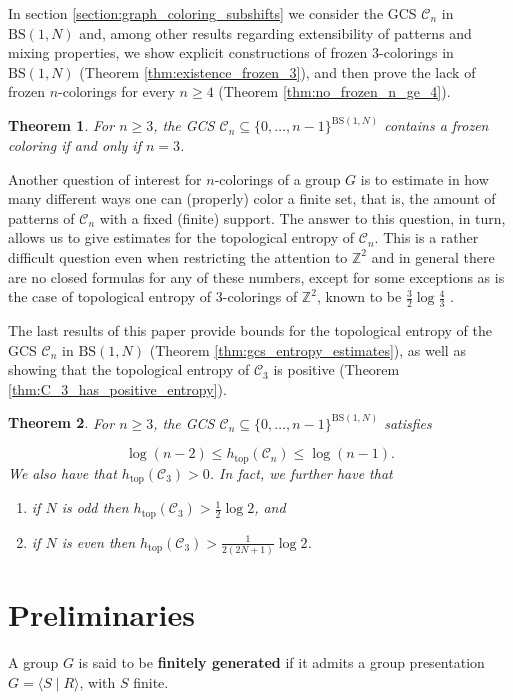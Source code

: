 \documentclass{aims}
\newcommand{\BS}[1][N]{\mathrm{BS}(1,#1)}
\def\htop{h_{\mathrm{top}}}
\newtheorem{theorem}{Theorem}[section]
\theoremstyle{definition}
\begin{document}
In section \ref{section:graph_coloring_subshifts} we consider the GCS $\mathcal{C}_n$ in $\BS$ and, among other results regarding extensibility of patterns and mixing properties, we show explicit constructions of frozen $3$-colorings in $\BS$ (Theorem \ref{thm:existence_frozen_3}), and then prove the lack of frozen $n$-colorings for every $n\ge 4$ (Theorem \ref{thm:no_frozen_n_ge_4}).

\begin{theorem}\label{thm:summary_gcs_frozen_colorings}
	For $n\ge 3$, the GCS $\mathcal{C}_n\subseteq\{0,\ldots,n-1\}^{\BS}$ contains a frozen coloring if and only if $n=3$.
\end{theorem}	

Another question of interest for $n$-colorings of a group $G$ is to estimate in how many different ways one can (properly) color a finite set, that is, the amount of patterns of $\mathcal{C}_n$ with a fixed (finite) support. The answer to this question, in turn, allows us to give estimates for the topological entropy of $\mathcal{C}_n$. This is a rather difficult question even when restricting the attention to $\mathbb{Z}^2$ and in general there are no closed formulas for any of these numbers, except for some exceptions as is the case of topological entropy of $3$-colorings of $\mathbb{Z}^2$, known to be $\frac{3}{2}\log\frac{4}{3}$ \cite{Lieb:1967zz}.


The last results of this paper provide bounds for the topological entropy of the GCS $\mathcal{C}_n$ in $\BS$ (Theorem \ref{thm:gcs_entropy_estimates}), as well as showing that the topological entropy of $\mathcal{C}_3$ is positive (Theorem \ref{thm:C_3_has_positive_entropy}).
\begin{theorem} \label{thm:summary_gcs_entropy}
	For $n\ge 3$, the GCS $\mathcal{C}_n\subseteq\{0,\ldots,n-1\}^{\BS}$ satisfies
	
	$$
	\log(n-2)\le\htop(\mathcal{C}_n)\le\log(n-1).
	$$
	We also have that $\htop(\mathcal{C}_3)>0$. In fact, we further have that
	\begin{enumerate}
		\item if $N$ is odd then $\htop(\mathcal{C}_3)>\frac{1}{2}\log 2$, and
		\item if $N$ is even then $\htop(\mathcal{C}_3)>\frac{1}{2(2N+1)}\log 2$.
	\end{enumerate}
\end{theorem}
	\section{Preliminaries}\label{section:preliminaries}
A group $G$ is said to be \textbf{finitely generated} if it admits a group presentation $G=\langle S\mid R\rangle$, with $S$ finite. 
\end{document}
